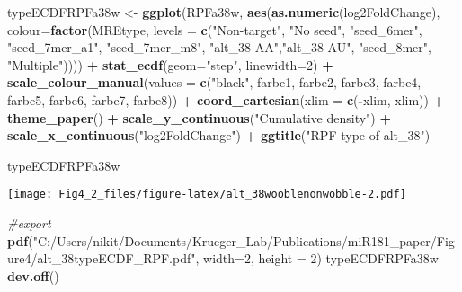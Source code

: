 \documentclass[
]{article}
\newenvironment{Shaded}{\begin{snugshade}}{\end{snugshade}}
\newcommand{\AttributeTok}[1]{\textcolor[rgb]{0.13,0.29,0.53}{#1}}
\newcommand{\CommentTok}[1]{\textcolor[rgb]{0.56,0.35,0.01}{\textit{#1}}}
\newcommand{\DecValTok}[1]{\textcolor[rgb]{0.00,0.00,0.81}{#1}}
\newcommand{\FunctionTok}[1]{\textcolor[rgb]{0.13,0.29,0.53}{\textbf{#1}}}
\newcommand{\NormalTok}[1]{#1}
\newcommand{\OtherTok}[1]{\textcolor[rgb]{0.56,0.35,0.01}{#1}}
\newcommand{\SpecialCharTok}[1]{\textcolor[rgb]{0.81,0.36,0.00}{\textbf{#1}}}
\newcommand{\StringTok}[1]{\textcolor[rgb]{0.31,0.60,0.02}{#1}}
\begin{document}
\begin{Shaded}
\begin{Highlighting}[]
\NormalTok{typeECDFRPFa38w }\OtherTok{\textless{}{-}} \FunctionTok{ggplot}\NormalTok{(RPFa38w, }\FunctionTok{aes}\NormalTok{(}\FunctionTok{as.numeric}\NormalTok{(log2FoldChange), }
                              \AttributeTok{colour=}\FunctionTok{factor}\NormalTok{(MREtype, }\AttributeTok{levels =} \FunctionTok{c}\NormalTok{(}\StringTok{"Non{-}target"}\NormalTok{, }\StringTok{"No seed"}\NormalTok{, }\StringTok{"seed\_6mer"}\NormalTok{, }\StringTok{"seed\_7mer\_a1"}\NormalTok{, }\StringTok{"seed\_7mer\_m8"}\NormalTok{, }\StringTok{"alt\_38 AA"}\NormalTok{,}\StringTok{"alt\_38 AU"}\NormalTok{, }\StringTok{"seed\_8mer"}\NormalTok{, }\StringTok{"Multiple"}\NormalTok{)))) }\SpecialCharTok{+} 
  \FunctionTok{stat\_ecdf}\NormalTok{(}\AttributeTok{geom=}\StringTok{"step"}\NormalTok{, }\AttributeTok{linewidth=}\DecValTok{2}\NormalTok{) }\SpecialCharTok{+}
  \FunctionTok{scale\_colour\_manual}\NormalTok{(}\AttributeTok{values =} \FunctionTok{c}\NormalTok{(}\StringTok{"black"}\NormalTok{, farbe1, farbe2, farbe3, farbe4, farbe5, farbe6, farbe7, farbe8)) }\SpecialCharTok{+}
  \FunctionTok{coord\_cartesian}\NormalTok{(}\AttributeTok{xlim =} \FunctionTok{c}\NormalTok{(}\SpecialCharTok{{-}}\NormalTok{xlim, xlim)) }\SpecialCharTok{+} 
  \FunctionTok{theme\_paper}\NormalTok{() }\SpecialCharTok{+}
  \FunctionTok{scale\_y\_continuous}\NormalTok{(}\StringTok{"Cumulative density"}\NormalTok{) }\SpecialCharTok{+} \FunctionTok{scale\_x\_continuous}\NormalTok{(}\StringTok{"log2FoldChange"}\NormalTok{) }\SpecialCharTok{+}
  \FunctionTok{ggtitle}\NormalTok{(}\StringTok{"RPF type of alt\_38"}\NormalTok{)}

\NormalTok{typeECDFRPFa38w}
\end{Highlighting}
\end{Shaded}

\texttt{[image: Fig4\_2\_files/figure-latex/alt\_38wooblenonwobble-2.pdf]}

\begin{Shaded}
\begin{Highlighting}[]
\CommentTok{\#export}
\FunctionTok{pdf}\NormalTok{(}\StringTok{"C:/Users/nikit/Documents/Krueger\_Lab/Publications/miR181\_paper/Figure4/alt\_38typeECDF\_RPF.pdf"}\NormalTok{, }\AttributeTok{width=}\DecValTok{2}\NormalTok{, }\AttributeTok{height =} \DecValTok{2}\NormalTok{)}
\NormalTok{typeECDFRPFa38w}
\FunctionTok{dev.off}\NormalTok{()}
\end{Highlighting}
\end{Shaded}
\end{document}
